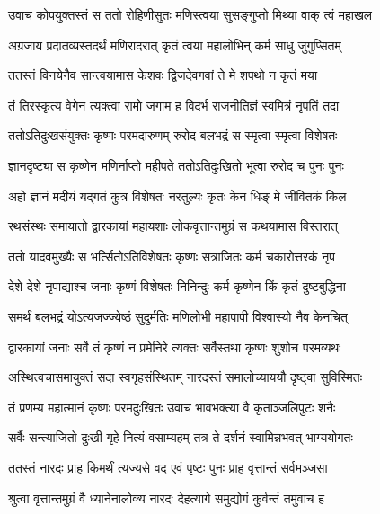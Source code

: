 \twolineshloka
{उवाच कोपयुक्तस्तं स ततो रोहिणीसुतः}
{मणिस्त्वया सुसङ्गुप्तो मिथ्या वाक् त्वं महाखल} %

\twolineshloka
{अग्रजाय प्रदातव्यस्तदर्थं मणिरादरात्}
{कृतं त्वया महालोभिन् कर्म साधु जुगुप्सितम्} %

\twolineshloka
{ततस्तं विनयेनैव सान्त्वयामास केशवः}
{द्विजदेवगवां ते मे शपथो न कृतं मया} %

\twolineshloka
{तं तिरस्कृत्य वेगेन त्यक्त्वा रामो जगाम ह}
{विदर्भ राजनीतिज्ञं स्वमित्रं नृपतिं तदा} %

\twolineshloka
{ततोऽतिदुःखसंयुक्तः कृष्णः परमदारुणम्}
{रुरोद बलभद्रं स स्मृत्वा स्मृत्वा विशेषतः} %

\twolineshloka
{ज्ञानदृष्ट्या स कृष्णेन मणिर्नाप्तो महीपते}
{ततोऽतिदुःखितो भूत्वा रुरोद च पुनः पुनः} %

\twolineshloka
{अहो ज्ञानं मदीयं यद्गतं कुत्र विशेषतः}
{नरतुल्यः कृतः केन धिङ् मे जीवितकं किल} %

\twolineshloka
{रथसंस्थः समायातो द्वारकायां महायशाः}
{लोकवृत्तान्तमुग्रं स कथयामास विस्तरात्} %

\twolineshloka
{ततो यादवमुख्यैः स भर्त्सितोऽतिविशेषतः}
{कृष्णः सत्राजितः कर्म चकारोत्तरकं नृप} %

\twolineshloka
{देशे देशे नृपाद्याश्च जनाः कृष्णं विशेषतः}
{निनिन्दुः कर्म कृष्णेन किं कृतं दुष्टबुद्धिना} %

\twolineshloka
{समर्थं बलभद्रं योऽत्यजज्ज्येष्ठं सुदुर्मतिः}
{मणिलोभी महापापी विश्वास्यो नैव केनचित्} %

\twolineshloka
{द्वारकायां जनाः सर्वे तं कृष्णं न प्रमेनिरे}
{त्यक्तः सर्वैस्तथा कृष्णः शुशोच परमव्यथः} %

\twolineshloka
{अस्थित्वचासमायुक्तं सदा स्वगृहसंस्थितम्}
{नारदस्तं समालोच्याययौ दृष्ट्वा सुविस्मितः} %

\twolineshloka
{तं प्रणम्य महात्मानं कृष्णः परमदुःखितः}
{उवाच भावभक्त्या वै कृताञ्जलिपुटः शनैः} %


\twolineshloka
{सर्वैः सन्त्याजितो दुःखी गृहे नित्यं वसाम्यहम्}
{तत्र ते दर्शनं स्वामिन्नभवत् भाग्ययोगतः} %

\twolineshloka
{ततस्तं नारदः प्राह किमर्थं त्यज्यसे वद}
{एवं पृष्टः पुनः प्राह वृत्तान्तं सर्वमञ्जसा} %

\twolineshloka
{श्रुत्वा वृत्तान्तमुग्रं वै ध्यानेनालोक्य नारदः}
{देहत्यागे समुद्योगं कुर्वन्तं तमुवाच ह} %


